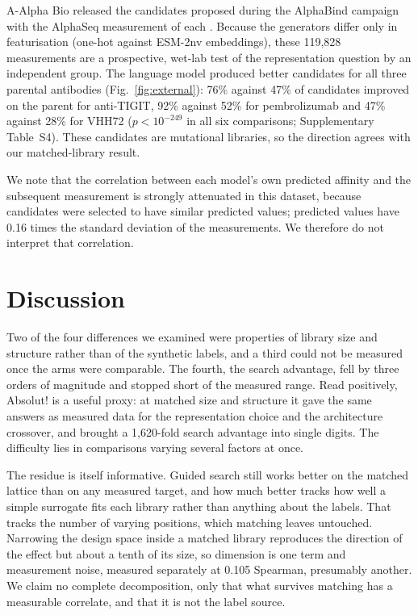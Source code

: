 \documentclass[pdflatex,sn-nature]{sn-jnl}
\theoremstyle{thmstyleone}
\theoremstyle{thmstyletwo}
\theoremstyle{thmstylethree}
\begin{document}
A-Alpha Bio released the candidates proposed during the AlphaBind campaign with
the AlphaSeq measurement of each \cite{alphabind2025}. Because the generators
differ only in featurisation (one-hot against ESM-2nv embeddings), these
119{,}828 measurements are a prospective, wet-lab test of the representation
question by an independent group. The language model produced better candidates
for all three parental antibodies (Fig.~\ref{fig:external}): 76\% against 47\%
of candidates improved on the parent for anti-TIGIT, 92\% against 52\% for
pembrolizumab and 47\% against 28\% for VHH72 ($p < 10^{-249}$ in all six
comparisons; Supplementary Table~S4). These candidates are mutational
libraries, so the direction agrees with our matched-library result.

We note that the correlation between each model's own predicted affinity and
the subsequent measurement is strongly attenuated in this dataset, because
candidates were selected to have similar predicted values; predicted values
have 0.16 times the standard deviation of the measurements. We therefore do
not interpret that correlation.

\section*{Discussion}\label{sec:discussion}

Two of the four differences we examined were properties of library size and
structure rather than of the synthetic labels, and a third could not be
measured once the arms were comparable. The fourth, the search advantage, fell
by three orders of magnitude and stopped short of the measured range. Read
positively, Absolut! is a useful proxy: at matched size and structure it gave
the same answers as measured data for the representation choice and the
architecture crossover, and brought a 1{,}620-fold search advantage into
single digits. The difficulty lies in comparisons varying several factors at
once.

The residue is itself informative. Guided search still works better on the
matched lattice than on any measured target, and how much better tracks how
well a simple surrogate fits each library rather than anything about the
labels. That tracks the number of varying positions, which matching leaves
untouched. Narrowing the design space inside a matched library
reproduces the direction of the effect but about a tenth of its size, so
dimension is one term and measurement noise, measured separately at 0.105
Spearman, presumably another. We claim no complete decomposition, only that
what survives matching has a measurable correlate, and that it is not the
label source.
\end{document}

